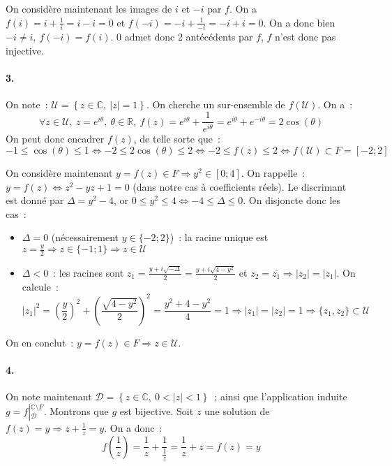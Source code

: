 \documentclass{article}
\newcommand{\abs}[1]{\left\vert #1 \right\vert}
\begin{document}
    On considère maintenant les images de $i$ et $-i$ par $f$. On a $f(i)=i+\frac{1}{i}=i-i=0$ et $f(-i)=-i+\frac{1}{-i}=-i+i=0$. On a donc bien $-i\neq i,\ f(-i)=f(i)$. 0 admet donc 2 antécédents par $f$, $f$ n'est donc pas injective.

    \paragraph{3.}
    On note~: $\mathscr{U}=\left\{z\in\mathbb{C},\ \abs{z}=1\right\}$. On cherche un sur-ensemble de $f(\mathscr{U})$. On a~:
    \begin{displaymath}
      \forall z\in\mathscr{U},\ z = e^{i\theta},\ \theta\in\mathbb{R},\ f(z)=e^{i\theta}+\frac{1}{e^{i\theta}}=e^{i\theta}+e^{-i\theta}=2\cos(\theta)
    \end{displaymath}
    On peut donc encadrer $f(z)$, de telle sorte que~:
    \begin{displaymath}
      -1 \leqslant \cos(\theta) \leqslant 1 \iff -2 \leqslant 2\cos(\theta) \leqslant 2 \iff -2 \leqslant f(z) \leqslant 2 \iff f(\mathscr{U})\subset F=[-2;2]
    \end{displaymath}

    On considère maintenant $y=f(z)\in F \Rightarrow y^2\in[0;4]$. On rappelle~: $y=f(z) \iff z^2 - yz +1 = 0$ (dans notre cas à coefficients réels). Le discrimant est donné par $\Delta = y^2-4$, or $0 \leqslant y^2 \leqslant 4 \iff -4 \leqslant \Delta \leqslant 0$. On disjoncte donc les cas~:
    \begin{itemize}
      \item $\Delta = 0$ (nécessairement $y\in\{-2;2\}$)~: la racine unique est $z=\frac{y}{2}\Rightarrow z\in\{-1;1\}\Rightarrow z\in\mathscr{U}$
      \item $\Delta < 0$~: les racines sont $z_1=\frac{y+i\sqrt{-\Delta}}{2}=\frac{y+i\sqrt{4-y^2}}{2}$ et $z_2 = \overline{z_1} \Rightarrow \abs{z_2}=\abs{z_1}$. On calcule~:
      \begin{displaymath}
        \abs{z_1}^2=\left(\frac{y}{2}\right)^2+\left(\frac{\sqrt{4-y^2}}{2}\right)^2=\frac{y^2+4-y^2}{4}=1 \Rightarrow \abs{z_1}=\abs{z_2}=1 \Rightarrow \{z_1, z_2\}\subset\mathscr{U}
      \end{displaymath}
    \end{itemize}
    On en conclut~: $y = f(z)\in F \Rightarrow z\in\mathscr{U}$.

    \paragraph{4.}
    On note maintenant $\mathscr{D}=\left\{z\in\mathbb{C},\ 0<\abs{z}<1\right\}$~; ainsi que l'application induite $g=f\left\vert_{\mathscr{D}}^{\mathbb{C}\setminus F}\right.$. Montrons que $g$ est bijective. Soit $z$ une solution de $f(z)=y \Rightarrow z+\frac{1}{z}=y$. On a donc~:
    \begin{displaymath}
      f\left(\frac{1}{z}\right)=\frac{1}{z}+\frac{1}{\frac{1}{z}} = \frac{1}{z}+z = f(z) = y
    \end{displaymath}
\end{document}
